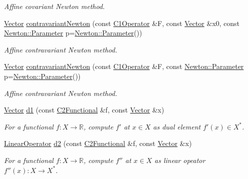 \begin{DoxyCompactItemize}
\begin{DoxyCompactList}\small\item\em Affine covariant Newton method. \end{DoxyCompactList}\item 
\hyperlink{classSpacy_1_1Vector}{Vector} \hyperlink{group__NewtonGroup_ga323071fce88ea5e655bb18fb4233101c}{contravariant\+Newton} (const \hyperlink{classSpacy_1_1C1Operator}{C1\+Operator} \&F, const \hyperlink{classSpacy_1_1Vector}{Vector} \&x0, const \hyperlink{structSpacy_1_1Newton_1_1Parameter}{Newton\+::\+Parameter} p=\hyperlink{structSpacy_1_1Newton_1_1Parameter}{Newton\+::\+Parameter}())
\begin{DoxyCompactList}\small\item\em Affine contravariant Newton method. \end{DoxyCompactList}\item 
\hyperlink{classSpacy_1_1Vector}{Vector} \hyperlink{group__NewtonGroup_ga8cde4ccdf9479141f8f8b92607f0f724}{contravariant\+Newton} (const \hyperlink{classSpacy_1_1C1Operator}{C1\+Operator} \&F, const \hyperlink{structSpacy_1_1Newton_1_1Parameter}{Newton\+::\+Parameter} p=\hyperlink{structSpacy_1_1Newton_1_1Parameter}{Newton\+::\+Parameter}())
\begin{DoxyCompactList}\small\item\em Affine contravariant Newton method. \end{DoxyCompactList}\item 
\hyperlink{classSpacy_1_1Vector}{Vector} \hyperlink{namespaceSpacy_ab6646eb7068eb9f1369e639cf0b620a2}{d1} (const \hyperlink{classSpacy_1_1C2Functional}{C2\+Functional} \&f, const \hyperlink{classSpacy_1_1Vector}{Vector} \&x)
\begin{DoxyCompactList}\small\item\em For a functional $ f: X\to \mathbb{R} $, compute $f'$ at $x\in X$ as dual element $ f'(x) \in X^* $. \end{DoxyCompactList}\item 
\hyperlink{classSpacy_1_1LinearOperator}{Linear\+Operator} \hyperlink{namespaceSpacy_a569d8fc0b4a0e292f257dd6307a25c8f}{d2} (const \hyperlink{classSpacy_1_1C2Functional}{C2\+Functional} \&f, const \hyperlink{classSpacy_1_1Vector}{Vector} \&x)
\begin{DoxyCompactList}\small\item\em For a functional $ f: X\to \mathbb{R} $, compute $f''$ at $x\in X$ as linear opeator $ f''(x): X \to X^* $. \end{DoxyCompactList}\item 

\end{DoxyCompactItemize}
